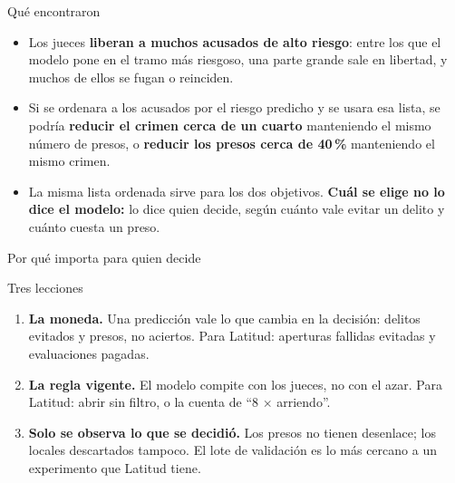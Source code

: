 \documentclass{beamer}
\begin{document}
\begin{frame}{Qué encontraron}
\begin{itemize}\itemsep6pt
  \item Los jueces \textbf{liberan a muchos acusados de alto riesgo}: entre los que el modelo pone en el tramo más riesgoso, una parte grande sale en libertad, y muchos de ellos se fugan o reinciden.
  \item Si se ordenara a los acusados por el riesgo predicho y se usara esa lista, se podría \textbf{reducir el crimen cerca de un cuarto} manteniendo el mismo número de presos, o \textbf{reducir los presos cerca de 40\,\%} manteniendo el mismo crimen.
  \item La misma lista ordenada sirve para los dos objetivos. \textbf{Cuál se elige no lo dice el modelo:} lo dice quien decide, según cuánto vale evitar un delito y cuánto cuesta un preso.
\end{itemize}
\medskip
{}
\end{frame}

\begin{frame}{Por qué importa para quien decide}
\begin{block}{Tres lecciones}
\begin{enumerate}\itemsep4pt
  \item \textbf{La moneda.} Una predicción vale lo que cambia en la decisión: delitos evitados y presos, no aciertos. Para Latitud: aperturas fallidas evitadas y evaluaciones pagadas.
  \item \textbf{La regla vigente.} El modelo compite con los jueces, no con el azar. Para Latitud: abrir sin filtro, o la cuenta de ``8 $\times$ arriendo''.
  \item \textbf{Solo se observa lo que se decidió.} Los presos no tienen desenlace; los locales descartados tampoco. El lote de validación es lo más cercano a un experimento que Latitud tiene.
\end{enumerate}
\end{block}
\end{frame}
\end{document}
